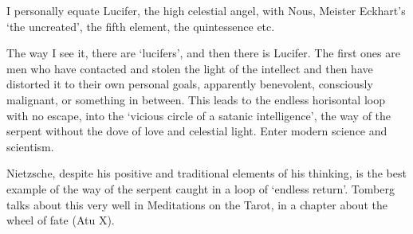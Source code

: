 \begin{footnotesize}
\begin{sffamily}
I personally equate Lucifer, the high celestial angel, with Nous, Meister Eckhart's `the uncreated', the fifth element, the quintessence etc.

The way I see it, there are `lucifers', and then there is Lucifer. The first ones are men who have contacted and stolen the light of the intellect and then have distorted it to their own personal goals, apparently benevolent, consciously malignant, or something in between. This leads to the endless horisontal loop with no escape, into the `vicious circle of a satanic intelligence', the way of the serpent without the dove of love and celestial light. Enter modern science and scientism.

Nietzsche, despite his positive and traditional elements of his thinking, is the best example of the way of the serpent caught in a loop of `endless return'. Tomberg talks about this very well in Meditations on the Tarot, in a chapter about the wheel of fate (Atu X).


\hfill

\end{sffamily}
\end{footnotesize}

